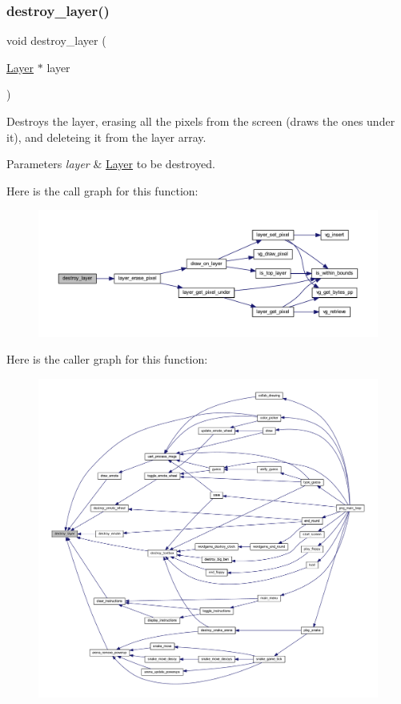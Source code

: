 \subsubsection{\texorpdfstring{destroy\+\_\+layer()}{destroy\_layer()}}
{\footnotesize\ttfamily void destroy\+\_\+layer (\begin{DoxyParamCaption}\item[{\mbox{\hyperlink{struct_layer}{Layer}} $\ast$}]{layer }\end{DoxyParamCaption})}



Destroys the layer, erasing all the pixels from the screen (draws the ones under it), and deleteing it from the layer array. 


\begin{DoxyParams}{Parameters}
{\em layer} & \mbox{\hyperlink{struct_layer}{Layer}} to be destroyed. \\
\hline
\end{DoxyParams}
Here is the call graph for this function\+:\nopagebreak
\begin{figure}[H]
\begin{center}
\leavevmode
\includegraphics[width=350pt]{group__layer_gae89d557f21d9465ba7372ff23cf05ae9_cgraph}
\end{center}
\end{figure}
Here is the caller graph for this function\+:\nopagebreak
\begin{figure}[H]
\begin{center}
\leavevmode
\includegraphics[width=350pt]{group__layer_gae89d557f21d9465ba7372ff23cf05ae9_icgraph}
\end{center}
\end{figure}

